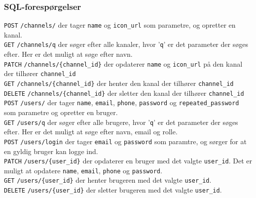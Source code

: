 \subsubsection{SQL-forespørgelser}
\texttt{POST} \texttt{/channels/} der tager \texttt{name} og \texttt{icon\_url} som parametre, og opretter en kanal.\\

\noindent
\texttt{GET} \texttt{/channels/q} der søger efter alle kanaler, hvor '\texttt{q}' er det parameter der søges efter. Her er det muligt at søge efter navn.\\

\noindent
\texttt{PATCH} \texttt{/channels/\{channel\_id\}} der opdaterer \texttt{name} og \texttt{icon\_url} på den kanal der tilhører \texttt{channel\_id}\\

\noindent
\texttt{GET} \texttt{/channels/\{channel\_id\}} der henter den kanal der tilhører \texttt{channel\_id}\\

\noindent
\texttt{DELETE} \texttt{/channels/\{channel\_id\}} der sletter den kanal der tilhører \texttt{channel\_id}\\


\texttt{POST} \texttt{/users/} der tager \texttt{name}, \texttt{email}, \texttt{phone}, \texttt{password} og \texttt{repeated\_password} som parametre og opretter en bruger.\\

\noindent
\texttt{GET} \texttt{/users/q} der søger efter alle brugere, hvor '\texttt{q}' er det parameter der søges efter. Her er det muligt at søge efter navn, email og rolle.\\

\noindent
\texttt{POST} \texttt{/users/login} der tager \texttt{email} og \texttt{password} som paramtre, og sørger for at en gyldig bruger kan logge ind.\\

\noindent
\texttt{PATCH} \texttt{/users/\{user\_id\}} der opdaterer en bruger med det valgte \texttt{user\_id}. Det er muligt at opdatere \texttt{name}, \texttt{email}, \texttt{phone} og \texttt{password}.\\

\noindent
\texttt{GET} \texttt{/users/\{user\_id\}} der henter brugeren med det valgte \texttt{user\_id}.\\

\noindent
\texttt{DELETE} \texttt{/users/\{user\_id\}} der sletter brugeren med det valgte \texttt{user\_id}.\\

